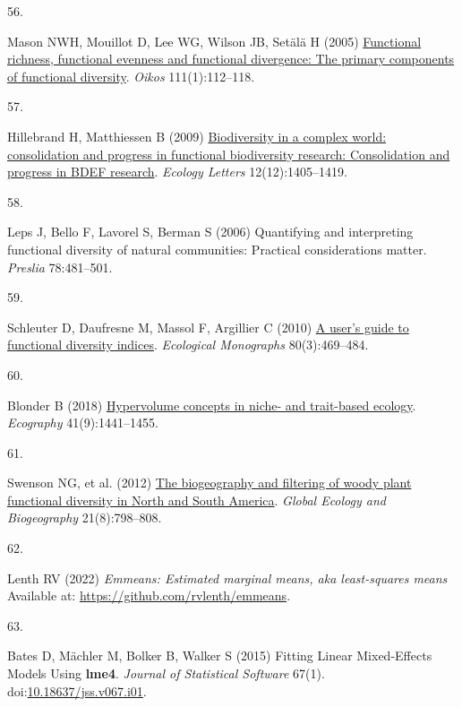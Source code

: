 \documentclass{article}
\newlength{\cslhangindent}
\newlength{\csllabelwidth}
\newlength{\cslentryspacingunit} %
\newenvironment{CSLReferences}[2] %
 {%
  \setlength{\parindent}{0pt}
  \ifodd #1
  \let\oldpar\par
  \def\par{\hangindent=\cslhangindent\oldpar}
  \fi
  \setlength{\parskip}{#2\cslentryspacingunit}
 }%
 {}
\newcommand{\CSLLeftMargin}[1]{\parbox[t]{\csllabelwidth}{#1}}
\newcommand{\CSLRightInline}[1]{\parbox[t]{\linewidth - \csllabelwidth}{#1}\break}
\begin{document}
\begin{CSLReferences}{0}{0}
\leavevmode{}%
\CSLLeftMargin{56. }%
\CSLRightInline{Mason NWH, Mouillot D, Lee WG, Wilson JB, Setälä H
(2005) \href{http://www.jstor.org/stable/3548774}{Functional richness,
functional evenness and functional divergence: The primary components of
functional diversity}. \emph{Oikos} 111(1):112--118.}

\leavevmode{}%
\CSLLeftMargin{57. }%
\CSLRightInline{Hillebrand H, Matthiessen B (2009)
\href{https://doi.org/10.1111/j.1461-0248.2009.01388.x}{Biodiversity in
a complex world: consolidation and progress in functional biodiversity
research: Consolidation and progress in BDEF research}. \emph{Ecology
Letters} 12(12):1405--1419.}

\leavevmode{}%
\CSLLeftMargin{58. }%
\CSLRightInline{Leps J, Bello F, Lavorel S, Berman S (2006) Quantifying
and interpreting functional diversity of natural communities: Practical
considerations matter. \emph{Preslia} 78:481--501.}

\leavevmode{}%
\CSLLeftMargin{59. }%
\CSLRightInline{Schleuter D, Daufresne M, Massol F, Argillier C (2010)
\href{https://doi.org/10.1890/08-2225.1}{A user's guide to functional
diversity indices}. \emph{Ecological Monographs} 80(3):469--484.}

\leavevmode{}%
\CSLLeftMargin{60. }%
\CSLRightInline{Blonder B (2018)
\href{https://doi.org/10.1111/ecog.03187}{Hypervolume concepts in niche-
and trait-based ecology}. \emph{Ecography} 41(9):1441--1455.}

\leavevmode{}%
\CSLLeftMargin{61. }%
\CSLRightInline{Swenson NG, et al. (2012)
\href{https://doi.org/10.1111/j.1466-8238.2011.00727.x}{The biogeography
and filtering of woody plant functional diversity in North and South
America}. \emph{Global Ecology and Biogeography} 21(8):798--808.}

\leavevmode{}%
\CSLLeftMargin{62. }%
\CSLRightInline{Lenth RV (2022) \emph{Emmeans: Estimated marginal means,
aka least-squares means} Available at:
\url{https://github.com/rvlenth/emmeans}.}

\leavevmode{}%
\CSLLeftMargin{63. }%
\CSLRightInline{Bates D, Mächler M, Bolker B, Walker S (2015) Fitting
Linear Mixed-Effects Models Using {\textbf{lme4}}. \emph{Journal of
Statistical Software} 67(1).
doi:\href{https://doi.org/10.18637/jss.v067.i01}{10.18637/jss.v067.i01}.}


\end{CSLReferences}
\end{document}
